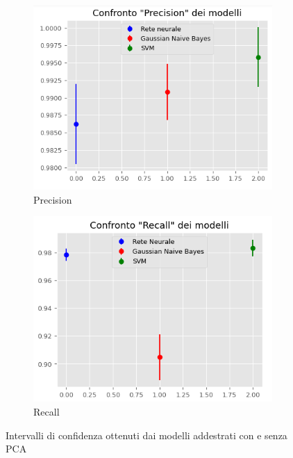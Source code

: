 \begin{figure}[!ht]
    \begin{subfigure}[b]{0.4\textwidth}
        \centering
        \includegraphics[width=\textwidth]{img/ris/precision_inter_pca.png}
        \caption{Precision}
        \label{fig:precision_pca}
    \end{subfigure}
    \hfill
    \begin{subfigure}[b]{0.4\textwidth}
        \centering
        \includegraphics[width=\textwidth]{img/ris/recall_inter_pca.png}
        \caption{Recall}
        \label{fig:recall_pca}
    \end{subfigure}
    \caption{Intervalli di confidenza ottenuti dai modelli addestrati con e senza PCA}
    \label{fig:intervalli_confidenza_pca}
\end{figure}


